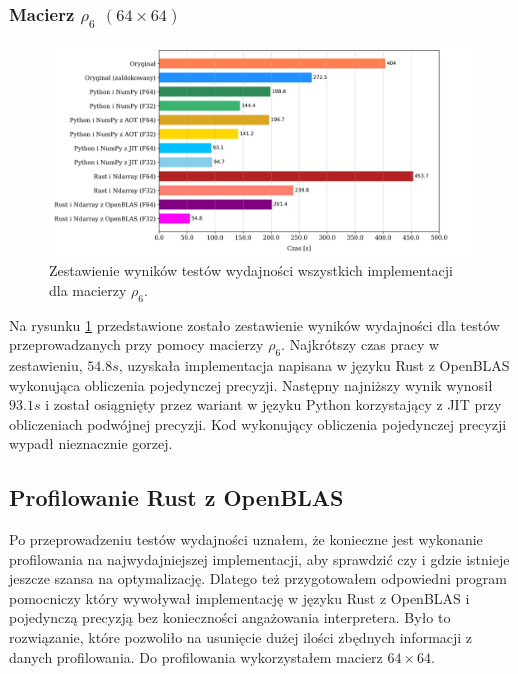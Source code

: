 \documentclass[11pt, a4paper]{article}
\begin{document}
\begin{sloppypar}
    \subsubsection{Macierz \texorpdfstring{$\rho_{6}$ $(64\times64)$}{rho6 64x64}}
    \begin{figure}[!ht]
      \centering
      \includegraphics[width=1.0\textwidth]{"resources/rho_6_matrix_comparison.png"}
      \caption{Zestawienie wyników testów wydajności wszystkich implementacji dla macierzy $\rho
      _{6}$.}
      \label{matrix-comparison-rho-6-plot}
    \end{figure}
    Na rysunku \ref{matrix-comparison-rho-6-plot} przedstawione zostało zestawienie
    wyników wydajności dla testów przeprowadzanych przy pomocy macierzy $\rho_{6}$. Najkrótszy
    czas pracy w zestawieniu, $54.8s$, uzyskała implementacja napisana w języku Rust z OpenBLAS
    wykonująca obliczenia pojedynczej precyzji. Następny najniższy wynik wynosił $93.1s$
    i został osiągnięty przez wariant w języku Python korzystający z JIT przy
    obliczeniach podwójnej precyzji. Kod wykonujący obliczenia pojedynczej precyzji wypadł
    nieznacznie gorzej.

    \FloatBarrier

    \subsection{Profilowanie Rust z OpenBLAS}
    Po przeprowadzeniu testów wydajności uznałem, że konieczne jest wykonanie profilowania
    na najwydajniejszej implementacji, aby sprawdzić czy i gdzie istnieje jeszcze szansa
    na optymalizację. Dlatego też przygotowałem odpowiedni program pomocniczy który wywoływał
    implementację w języku Rust z OpenBLAS i pojedynczą precyzją bez konieczności angażowania
    interpretera. Było to rozwiązanie, które pozwoliło na usunięcie dużej ilości zbędnych
    informacji z danych profilowania. Do profilowania wykorzystałem macierz $64\times64$.


\end{sloppypar}
\end{document}
